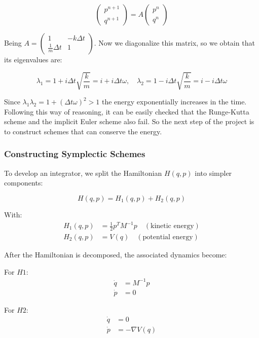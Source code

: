 \documentclass{article}
\begin{document}
\[
	\begin{pmatrix} p^{n+1} \\ q^{n+1} \end{pmatrix} = A \begin{pmatrix} p^{n} \\ q^{n} \end{pmatrix}
\]

Being \(A = \begin{pmatrix} 1 & -k\Delta t \\ \frac{1}{m} \Delta t & 1  \end{pmatrix}\). Now we diagonalize this matrix, so we obtain that its eigenvalues are:

\[
	\lambda_1 = 1 + i\Delta t\sqrt{\frac{k}{m}} = i + i \Delta t \omega, \quad
	\lambda_2 = 1 - i\Delta t\sqrt{\frac{k}{m}} = i - i \Delta t \omega
\]

Since \(\lambda_1 \lambda_2 = 1 + (\Delta t \omega)^2 > 1\) the energy exponentially increases in the time. Following this way of reasoning, it can be easily checked that the Runge-Kutta scheme and the implicit Euler scheme also fail. So the next step of the project is to construct schemes that can conserve the energy.


\subsubsection{Constructing Symplectic Schemes}
\label{sec:constructing_symplectic_schemes}

To develop an integrator, we split the Hamiltonian \(H(q,p)\) into simpler components:

\begin{equation*}
	H(q,p) = H_1(q,p) + H_2(q,p)
\end{equation*}

With:
\begin{align*}
	H_1(q,p) & = \frac{1}{2} p^T M^{-1} p \quad (\text{kinetic energy}) \\
	H_2(q,p) & = V(q) \quad (\text{potential energy})
\end{align*}

After the Hamiltonian is decomposed, the associated dynamics become:

For \(H1\):
\begin{align*}
	\dot{q} &= M^{-1}p \\
	\dot{p} &= 0
\end{align*}

For \(H2\):
\begin{align*}
	\dot{q} &= 0 \\
	\dot{p} &= -\nabla V(q)
\end{align*}
\end{document}
